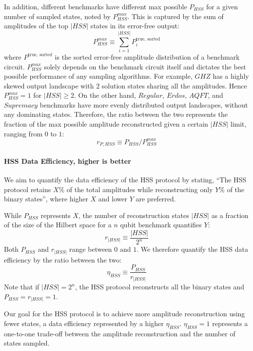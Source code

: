 In addition, different benchmarks have different max possible $P_{HSS}$
for a given number of sampled states,
noted by $P_{HSS}^{max}$.
This is captured by the sum of amplitudes of the top $|HSS|$ states in its error-free output:
\begin{equation}
    P_{HSS}^{max}\equiv\sum_{i=1}^{|HSS|}P_i^{\textrm{true, sorted}}
\end{equation}
where $P^{\textrm{true, sorted}}$ is the sorted error-free amplitude distribution of a benchmark circuit.
$P_{HSS}^{max}$ solely depends on the benchmark circuit itself and dictates the best possible performance of any sampling algorithms.
For example, $GHZ$ has a highly skewed output landscape with $2$ solution states sharing all the amplitudes.
Hence $P_{HSS}^{max}=1$ for $|HSS|\geq2$.
On the other hand, $Regular$, $Erdos$, $AQFT$, and $Supremacy$ benchmarks have more evenly distributed output landscapes,
without any dominating states.
Therefore, the ratio between the two represents the fraction of the max possible amplitude reconstructed given a certain $|HSS|$ limit,
ranging from $0$ to $1$:
\begin{equation}
    r_{P,HSS}\equiv P_{HSS}/P_{HSS}^{max}\label{eq:hss_amplitude_ratio}
\end{equation}

\paragraph{HSS Data Efficiency, higher is better}
We aim to quantify the data efficiency of the HSS protocol by stating,
“The HSS protocol retains $X\%$ of the total amplitudes while reconstructing only $Y\%$ of the binary states”,
where higher $X$ and lower $Y$ are preferred.

While $P_{HSS}$ represents $X$,
the number of reconstruction states $|HSS|$ as a fraction of the size of the Hilbert space for a $n$ qubit benchmark quantifies $Y$:
\begin{equation}
    r_{|HSS|}\equiv\frac{|HSS|}{2^n}
\end{equation}
Both $P_{HSS}$ and $r_{|HSS|}$ range between $0$ and $1$.
We therefore quantify the HSS data efficiency by the ratio between the two:
\begin{equation}
    \eta_{HSS}\equiv\frac{P_{HSS}}{r_{|HSS|}}\label{eq:hss_efficiency}
\end{equation}
Note that if $|HSS|=2^n$,
the HSS protocol reconstructs all the binary states and $P_{HSS}=r_{|HSS|}=1$.

Our goal for the HSS protocol is to achieve more amplitude reconstruction using fewer states,
a data efficiency represented by a higher $\eta_{HSS}$.
$\eta_{HSS}=1$ represents a one-to-one trade-off between the amplitude reconstruction and the number of states sampled.